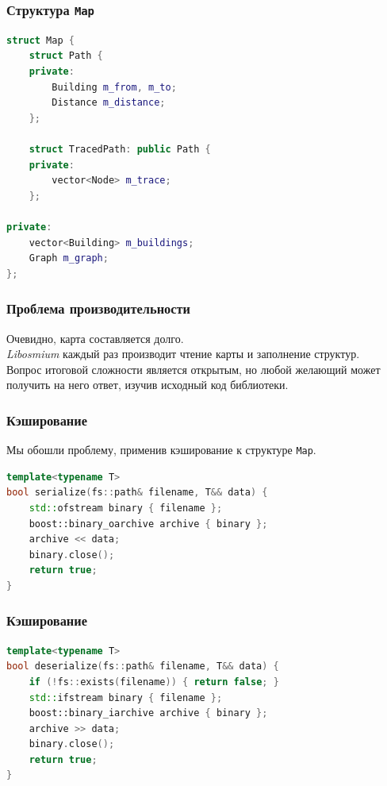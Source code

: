 \documentclass{beamer}
\begin{document}
\begin{frame}[fragile]
\frametitle{Структура \texttt{Map}}
\begin{lstlisting}[language=C++]
struct Map {
	struct Path {
	private:
		Building m_from, m_to;
		Distance m_distance;
	};

	struct TracedPath: public Path {
	private:
		vector<Node> m_trace;
	};
	
private:
	vector<Building> m_buildings;
	Graph m_graph;
};
\end{lstlisting}
\end{frame}

\begin{frame}
\frametitle{Проблема производительности}
Очевидно, карта составляется долго.\\
\textit{Libosmium} каждый раз производит чтение карты и заполнение структур.\\
Вопрос итоговой сложности является открытым, но любой желающий может получить на него ответ, изучив исходный код библиотеки.
\end{frame}

\begin{frame}[fragile]
\frametitle{Кэширование}
Мы обошли проблему, применив кэширование к структуре \texttt{Map}.\\
\begin{lstlisting}[language=C++]
template<typename T>
bool serialize(fs::path& filename, T&& data) {
	std::ofstream binary { filename };
	boost::binary_oarchive archive { binary };
	archive << data;
	binary.close();
	return true;
}
\end{lstlisting}
\end{frame}

\begin{frame}[fragile]
\frametitle{Кэширование}
\begin{lstlisting}[language=C++]
template<typename T>
bool deserialize(fs::path& filename, T&& data) {
	if (!fs::exists(filename)) { return false; }
	std::ifstream binary { filename };
	boost::binary_iarchive archive { binary };
	archive >> data;
	binary.close();
	return true;
}
\end{lstlisting}
\end{frame}
\end{document}
